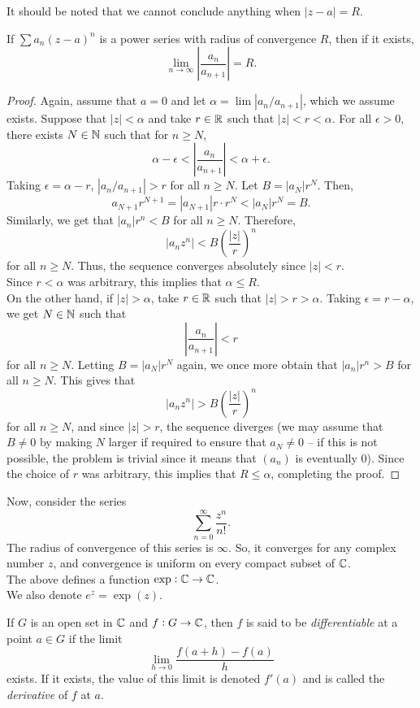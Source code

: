 	It should be noted that we cannot conclude anything when $|z-a|=R$.

	\begin{theorem}
		If $\sum a_n (z-a)^n$ is a power series with radius of convergence $R$, then if it exists,
		\[ \lim_{n\to\infty} \left| \frac{a_n}{a_{n+1}} \right| = R. \] 
	\end{theorem}
	\begin{proof}
		Again, assume that $a = 0$ and let $\alpha = \lim |a_n / a_{n+1}|$, which we assume exists. Suppose that $|z| < \alpha$ and take $r \in \mathbb{R}$ such that $|z| < r < \alpha$. For all $\epsilon > 0$, there exists $N \in \mathbb{N}$ such that for $n \ge N$,
		\[ \alpha - \epsilon < \left|\frac{a_n}{a_{n+1}}\right| < \alpha + \epsilon. \]
		Taking $\epsilon = \alpha - r$, $|a_n / a_{n+1}| > r$ for all $n \ge N$. Let $B = |a_N| r^N$. Then,
		\[ a_{N+1} r^{N+1} = |a_{N+1}| r \cdot r^N < |a_N| r^N = B. \]
		Similarly, we get that $|a_n| r^n < B$ for all $n \ge N$. Therefore,
		\[ |a_n z^n| < B \left( \frac{|z|}{r} \right)^n \]
		for all $n \ge N$. Thus, the sequence converges absolutely since $|z| < r$.\\
		Since $r < \alpha$ was arbitrary, this implies that $\alpha \le R$.\\

		On the other hand, if $|z| > \alpha$, take $r \in \mathbb{R}$ such that $|z| > r > \alpha$. Taking $\epsilon = r - \alpha$, we get $N \in \mathbb{N}$ such that
		\[ \left|\frac{a_n}{a_{n+1}}\right| < r \]
		for all $n \ge N$. Letting $B = |a_N| r^N$ again, we once more obtain that $|a_n| r^n > B$ for all $n \ge N$. This gives that
		\[ |a_n z^n| > B \left( \frac{|z|}{r} \right)^n  \]
		for all $n \ge N$, and since $|z| > r$, the sequence diverges (we may assume that $B \ne 0$ by making $N$ larger if required to ensure that $a_N \ne 0$ -- if this is not possible, the problem is trivial since it means that $(a_n)$ is eventually $0$). Since the choice of $r$ was arbitrary, this implies that $R \le \alpha$, completing the proof.
	\end{proof}

	Now, consider the series
	\[ \sum_{n=0}^\infty \frac{z^n}{n!}. \]
	The radius of convergence of this series is $\infty$. So, it converges for any complex number $z$, and convergence is uniform on every compact subset of $\mathbb{C}$.\\
	The above defines a function $\exp:\mathbb{C}\to\mathbb{C}$.\\
	We also denote $e^z = \exp(z)$.

	\begin{fdef}[Differentiability]
		If $G$ is an open set in $\mathbb{C}$ and $f : G \to \mathbb{C}$, then $f$ is said to be \emph{differentiable} at a point $a \in G$ if the limit
		\[ \lim_{h\to 0} \frac{f(a+h) - f(a)}{h} \]
		exists. If it exists, the value of this limit is denoted $f'(a)$ and is called the \emph{derivative} of $f$ at $a$.
	\end{fdef}

